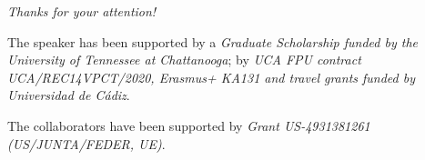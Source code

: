 \begin{frame}{}
	\centering
	\vspace*{1cm}
	{\Huge
		\emph{Thanks for your attention!}}
	
	\vspace*{1cm}
	\begin{acknowledgements}
		The speaker has been supported by a \textit{Graduate Scholarship funded by the University of Tennessee at Chattanooga}; by \textit{UCA FPU contract UCA/REC14VPCT/2020, Erasmus+ KA131 and travel grants funded by Universidad de Cádiz}.
		
		The collaborators have been supported by \textit{Grant US-4931381261 (US/JUNTA/FEDER, UE)}.
	\end{acknowledgements}
\end{frame}
